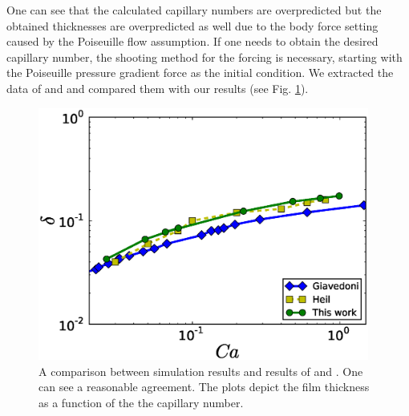 \documentclass[preprint,12pt]{elsarticle}
\begin{document}
One can see that the calculated
capillary numbers are overpredicted but the obtained thicknesses are overpredicted
as well due to the body force setting caused by the Poiseuille flow assumption. If one
needs to obtain the desired capillary number, the shooting method for the forcing is
necessary, starting with the Poiseuille pressure gradient force as the initial condition. We extracted
the data of 
\citet{giavedoni-numerical} and \citet{heil-bretherton} and compared them with our results (see 
Fig. \ref{fig:capillary:comparison}).
\begin{figure}
\includegraphics[width=0.97\textwidth]{Figures/Capillary/capillaries_comparison_real.eps}
\caption{A comparison between simulation results and results of
\citet{giavedoni-numerical} and \citet{heil-bretherton}. One can see a
reasonable agreement. The plots depict the film thickness as a function of the
the capillary number.\label{fig:capillary:comparison}}
\end{figure}
\end{document}

